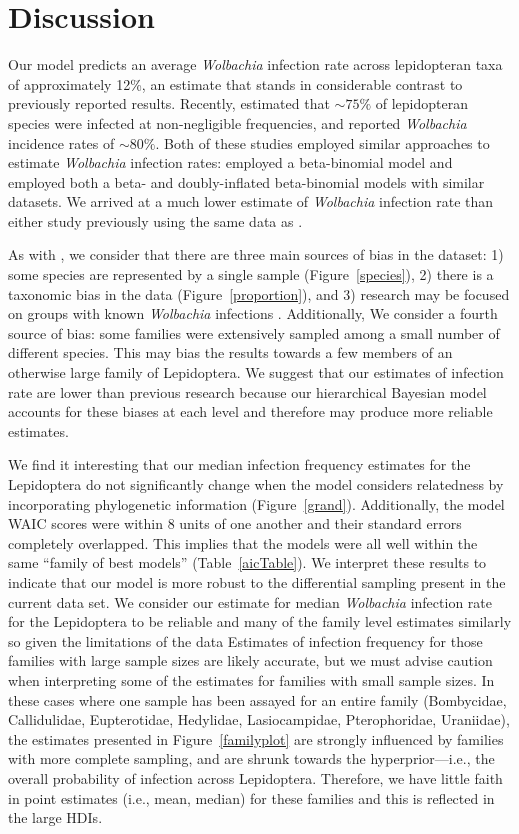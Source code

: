 \documentclass{frontiersSCNS}
\begin{document}
\section{Discussion}
Our model predicts an average \emph{Wolbachia} infection rate across lepidopteran taxa of approximately 12\%, an estimate that stands in considerable contrast to previously reported results. Recently, \cite{Weinert:2015aa} estimated that $\sim75\%$ of lepidopteran species were infected at non-negligible frequencies, and \cite{Ahmed:2015aa} reported \emph{Wolbachia} incidence rates of $\sim80\%$. Both of these studies employed similar approaches to estimate \emph{Wolbachia} infection rates: \cite{Ahmed:2015aa} employed a beta-binomial model and \cite{Weinert:2015aa} employed both a beta- and doubly-inflated beta-binomial models with  similar datasets. We arrived at a much lower estimate of \emph{Wolbachia} infection rate than either study previously using the same data as \cite{Weinert:2015aa}. 

As with \cite{Weinert:2015aa}, we consider that there are three main sources of bias in the dataset: 1) some species are represented by a single sample (Figure~\ref{species}), 2) there is a taxonomic bias in the data (Figure~\ref{proportion}), and 3) research may be focused on groups with known \emph{Wolbachia} infections \citep[e.g., ][]{Nice:2009p7399}. Additionally, We consider a fourth source of bias: some families were  extensively sampled among a small number of different species. This may bias the results towards a few members of an otherwise large family of Lepidoptera. We suggest that our estimates of infection rate are lower than previous research because our hierarchical Bayesian model accounts for these biases at each level and therefore may produce more reliable estimates.

We find it interesting that our median infection frequency estimates for the Lepidoptera do not significantly change when the model considers relatedness by incorporating phylogenetic information (Figure~\ref{grand}). Additionally, the model WAIC scores were within 8 units of one another and their standard errors completely overlapped. This implies that the models were all well within the same ``family of best models'' (Table~\ref{aicTable}). We interpret these results to indicate that our model is more robust to the differential sampling present in the current data set. We consider our estimate for median \emph{Wolbachia} infection rate for the Lepidoptera to be reliable and many of the family level estimates similarly so given the limitations of the data Estimates of infection frequency for those families with large sample sizes are likely accurate, but we must advise caution when interpreting some of the estimates for families with small sample sizes. In these cases where one sample has been assayed for an entire family (Bombycidae, Callidulidae, Eupterotidae, Hedylidae, Lasiocampidae, Pterophoridae, Uraniidae), the estimates presented in Figure~\ref{familyplot} are strongly influenced by families with more complete sampling, and are shrunk towards the hyperprior---i.e., the overall probability of infection across Lepidoptera. Therefore, we have little faith in point estimates (i.e., mean, median) for these families and this is reflected in the large HDIs. 
\end{document}
